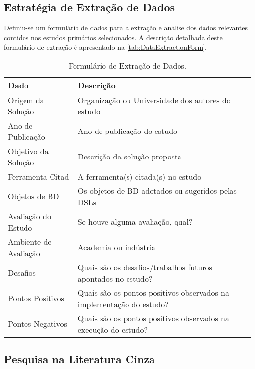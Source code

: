      \subsection{Estratégia de Extração de Dados} \label{ssec:EstratExtDados}

Definiu-se um formulário de dados para a extração e análise dos dados relevantes contidos nos estudos primários selecionados. 
A descrição detalhada deste formulário de extração é apresentado na \autoref{tab:DataExtractionForm}.

\begin{table}[!htb]
    \centering
    \small
    \caption{Formulário de Extração de Dados.}
    \label{tab:DataExtractionForm}
    \begin{tabular}{l|p{11cm}}
    \bottomrule
    \rowcolor[HTML]{C0C0C0} 
    \textbf{Dado} & \textbf{Descrição} \\
    \hline
    Origem da Solução & Organização ou Universidade dos autores do estudo
    \\
    Ano de Publicação & Ano de publicação do estudo
    \\
    Objetivo da Solução & Descrição da solução proposta
    \\
    Ferramenta Citad & A ferramenta(s) citada(s) no estudo
    \\
    Objetos de \ac{BD} & Os objetos de \ac{BD} adotados ou sugeridos pelas \acp{DSL}
    \\
    Avaliação do Estudo & Se houve alguma avaliação, qual?
    \\
    Ambiente de Avaliação & Academia ou indústria
    \\
    Desafios & Quais são os desafios/trabalhos futuros apontados no estudo?
    \\
    Pontos Positivos & Quais são os pontos positivos observados na implementação do estudo?
    \\
    Pontos Negativos & Quais são os pontos positivos observados na execução do estudo?
    \\
    \toprule
    \end{tabular}
\end{table}

\subsection{Pesquisa na Literatura Cinza} \label{sec:ExecMapeamento}

